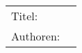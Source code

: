 ~\newline
\begin{flushleft}
	\begin{tabular}{lp{11cm}}
		Titel:&  \titel \\ 
		Authoren:&  \autor \\
	\end{tabular} 
\end{flushleft}
